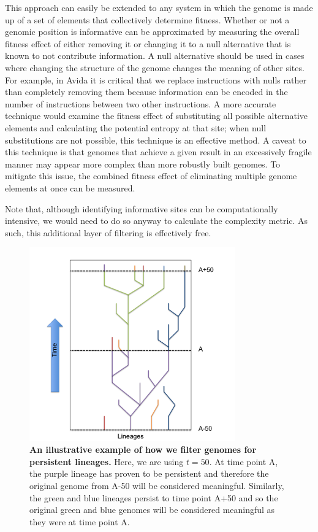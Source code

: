 \documentclass[letterpaper]{article}
\begin{document}
This approach can easily be extended to any system in which the genome is made up of a set of elements that collectively determine fitness. Whether or not a genomic position is informative can be approximated by measuring the overall fitness effect of either removing it or changing it to a null alternative that is known to not contribute information. A null alternative should be used in cases where changing the structure of the genome changes the meaning of other sites. For example, in Avida it is critical that we replace instructions with nulls rather than completely removing them because information can be encoded in the number of instructions between two other instructions. A more accurate technique would examine the fitness effect of substituting all possible alternative elements and calculating the potential entropy at that site; when null substitutions are not possible, this technique is an effective method. A caveat to this technique is that genomes that achieve a given result in an excessively fragile manner may appear more complex than more robustly built genomes. To mitigate this issue, the combined fitness effect of eliminating multiple genome elements at once can be measured.

Note that, although identifying informative sites can be computationally intensive, we would need to do so anyway to calculate the complexity metric. As such, this additional layer of filtering is effectively free.

\begin{figure}
\includegraphics[width=3.5in]{figs/LineageFigure.png}
\caption{\textbf{An illustrative example of how we filter genomes for persistent lineages.} Here, we are using $t = 50$. At time point A, the purple lineage has proven to be persistent and therefore the original genome from A-50 will be considered meaningful. Similarly, the green and blue lineages persist to time point A+50 and so the original green and blue genomes will be considered meaningful as they were at time point A.}
\label{lineages}
\end{figure}
\end{document}
